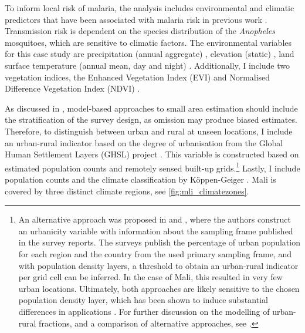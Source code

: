To inform local risk of malaria, the analysis includes environmental and climatic predictors that have been associated with malaria risk in previous work \autocite[see][and the references therein]{weissReexaminingEnvironmentalCorrelates2015, millarDetectingLocalRisk2018, weissMappingGlobalPrevalence2019, mohammedSpatialAnalysisClimatic2022}. Transmission risk is dependent on the species distribution of the \textit{Anopheles} mosquitoes, which are sensitive to climatic factors. The environmental variables for this case study are precipitation (annual aggregate) \autocite{funkClimateHazardsInfrared2015}, elevation (static) \autocite{jarvisHolefilledSRTMGlobe2008}, land surface temperature (annual mean, day and night) \autocite{didanMODISTerraVegetation2021b}. Additionally, I include two vegetation indices, the Enhanced Vegetation Index (EVI) and Normalised Difference Vegetation Index (NDVI) \autocite{wanMODISTerraLand2021}. 

As discussed in \textcite{dongModelingPresentationVaccination2021, paigeDesignModelBasedApproaches2022}, model-based approaches to small area estimation should include the stratification of the survey design, as omission may produce biased estimates. Therefore, to distinguish between urban and rural at unseen locations, I include an urban-rural indicator based on the degree of urbanisation from the Global Human Settlement Layers (GHSL) project \autocite{schiavinaGHSSMODR2022AGHS2022}. This variable is constructed based on estimated population counts and remotely sensed built-up grids.\footnote{An alternative approach was proposed in \textcite{dongModelingPresentationVaccination2021} and \textcite{paigeDesignModelBasedApproaches2022}, where the authors construct an urbanicity variable with information about the sampling frame published in the survey reports. The surveys publish the percentage of urban population for each region and the country from the used primary sampling frame, and with population density layers, a threshold to obtain an urban-rural indicator per grid cell can be inferred. In the case of Mali, this resulted in very few urban locations. Ultimately, both approaches are likely sensitive to the chosen population density layer, which has been shown to induce substantial differences in applications \autocite[see, for example, ][]{hierinkDifferencesGriddedPopulation2022a}. For further discussion on the modelling of urban-rural fractions, and a comparison of alternative approaches, see \textcite{wuModelingUrbanRural2022}.} Lastly, I include population counts \autocite{schiavinaGHSPOPR2022AGHS2022} and the climate classification by Köppen-Geiger \autocite{beckPresentFutureKoppenGeiger2018}. Mali is covered by three distinct climate regions, see \autoref{fig:mli_climatezones}.

